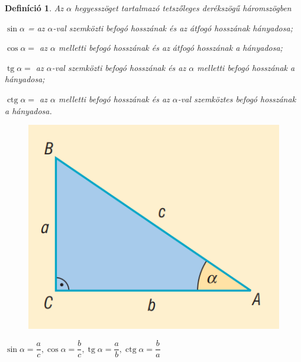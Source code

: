 \documentclass[12pt,a4paper]{article}
\newtheorem{definition}{Definíció} [section]
\DeclareMathOperator{\tg}{tg}
\DeclareMathOperator{\ctg}{ctg}
\begin{document}
\begin{definition}
Az $\alpha$ hegyesszöget tartalmazó tetszőleges derékszögű háromszögben

$\sin\alpha$ = az $\alpha$-val szemközti befogó hosszának és az átfogó hosszának hányadosa;

$\cos\alpha =$ az $\alpha$ melletti befogó hosszának és az átfogó hosszának a hányadosa;

$\tg \alpha =$ az $\alpha$-val szemközti befogó hosszának és az $\alpha$ melletti befogó hosszának a hányadosa;

$\ctg\alpha =$ az $\alpha$ melletti befogó hosszának és az $\alpha$-val szemköztes befogó hosszának a hányadosa.
\begin{figure}[h]
\centering
\includegraphics[scale=0.3]{geometry/derekszogu}
\end{figure}

\centering
$\sin\alpha=\dfrac{a}{c}, \cos\alpha=\dfrac{b}{c}, \tg\alpha=\dfrac{a}{b}, \ctg\alpha=\dfrac{b}{a}$
\end{definition}
\end{document}
